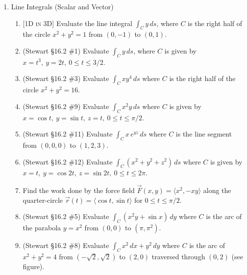 \documentclass[12pt]{article}
\newcommand{\dimtag}[1]{{\footnotesize\textsc{[#1]}}\;}
\begin{document}
\begin{enumerate}
\item Line Integrals (Scalar and Vector)
    \begin{enumerate}
        \item \dimtag{1D in 3D} Evaluate the line integral $\int_C y\,ds$, where $C$ is the right half of the circle $x^2 + y^2 = 1$ from $(0,-1)$ to $(0,1)$.
        \item (Stewart \S16.2 \#1) Evaluate $\int_C y\,ds$, where $C$ is given by $x = t^3,\ y = 2t,\ 0 \leq t \leq 3/2$.
        \item (Stewart \S16.2 \#3) Evaluate $\int_C xy^4\,ds$ where $C$ is the right half of the circle $x^2 + y^2 = 16$.
        \item (Stewart \S16.2 \#9) Evaluate $\int_C x^2 y\,ds$ where $C$ is given by $x = \cos t,\ y = \sin t,\ z = t,\ 0 \leq t \leq \pi/2$.
        \item (Stewart \S16.2 \#11) Evaluate $\int_C x\,e^{yz}\,ds$ where $C$ is the line segment from $(0,0,0)$ to $(1,2,3)$.
        \item (Stewart \S16.2 \#12) Evaluate $\int_C (x^2 + y^2 + z^2)\, ds$ where $C$ is given by $x=t,\ y=\cos 2t,\ z=\sin 2t,\ 0\leq t \leq 2\pi$.
        \item Find the work done by the force field $\vec{F}(x,y) = \langle x^2, -xy \rangle$ along the quarter-circle $\vec{r}(t) = \langle \cos t, \sin t \rangle$ for $0 \leq t \leq \pi/2$.
        \item (Stewart \S16.2 \#5) Evaluate $\int_C (x^2 y + \sin x)\,dy$ where $C$ is the arc of the parabola $y = x^2$ from $(0,0)$ to $(\pi,\pi^2)$.
        \item (Stewart \S16.2 \#8) Evaluate $\int_C x^2\,dx + y^2\,dy$ where $C$ is the arc of $x^2 + y^2 = 4$ from $(-\sqrt{2},\sqrt{2})$ to $(2,0)$ traversed through $(0,2)$ (see figure).
        \begin{center}
        \end{center}

\end{enumerate}
\end{enumerate}
\end{document}
